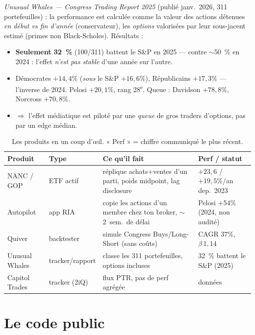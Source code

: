 \documentclass[11pt,a4paper]{article}
\begin{document}
\emph{Unusual Whales — Congress Trading Report 2025} (publié janv.~2026, 311 portefeuilles) : la performance
est calculée comme la valeur des actions détenues \emph{en début vs fin d'année} (conservateur), les
\emph{options} valorisées par leur sous-jacent estimé (primes non Black-Scholes). Résultats :
\begin{itemize}
  \item \textbf{Seulement 32~\%} (100/311) battent le S\&P en 2025 --- contre $\sim$50~\% en 2024 :
  l'effet \emph{n'est pas stable} d'une année sur l'autre.
  \item Démocrates $+14{,}4\%$ (\emph{sous} le S\&P $+16{,}6\%$), Républicains $+17{,}3\%$ --- l'inverse de
  2024. Pelosi $+20{,}1\%$, rang 28\textsuperscript{e}. Queue : Davidson $+78{,}8\%$, Norcross $+70{,}8\%$.
  \item $\Rightarrow$ l'effet médiatique est piloté par une \emph{queue} de gros traders d'options, pas par un
  edge médian.
\end{itemize}

\begin{table}[h]\centering\small
\caption{Les produits en un coup d'\oe il. « Perf » = chiffre communiqué le plus récent.}
\renewcommand{\arraystretch}{1.15}
\begin{tabularx}{\textwidth}{@{}p{2.3cm} p{2.2cm} X p{2.6cm}@{}}
\toprule
\textbf{Produit} & \textbf{Type} & \textbf{Ce qu'il fait} & \textbf{Perf / statut} \\
\midrule
NANC / GOP & ETF actif & réplique achats+ventes d'un parti, poids midpoint, lag disclosure & $+23{,}6$ / $+19{,}5\%$/an dep.~2023 \\
Autopilot & app RIA & copie les actions d'un membre chez ton broker, $\sim$2~sem.~de délai & Pelosi $+54\%$ (2024, non audité) \\
Quiver & backtester & simule Congress Buys/Long-Short (sans coûts) & CAGR $37\%$, $\beta\,1{,}14$ \\
Unusual Whales & tracker/rapport & classe les 311 portefeuilles, options incluses & 32~\% battent le S\&P (2025) \\
Capitol Trades & tracker (2iQ) & flux PTR, pas de perf agrégée & données \\
\bottomrule
\end{tabularx}
\end{table}

\section{Le code public}
\end{document}
